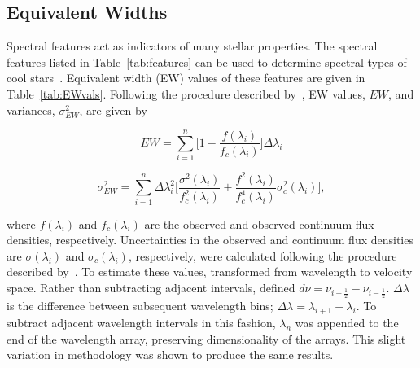 \subsection{Equivalent Widths}

Spectral features act as indicators of many stellar properties.  The 
spectral features listed in Table~\ref{tab:features} 
can be used to determine spectral types of cool 
stars~\cite{Rayner_2009}.  Equivalent width (EW) 
values of these features are given in Table~\ref{tab:EWvals}.  
Following the procedure described by~\cite{Cushing_2005}, EW values, $EW$, and 
variances, $\sigma_{EW}^{2}$, are given by


\begin{equation}\label{eq:EW}
	EW = \sum_{i=1}^{n} \bigg[1 - \frac{f(\lambda_{i})}{f_{c}(\lambda_{i})} \bigg] \Delta\lambda_{i}
\end{equation}

\begin{equation}\label{eq:EWvar}
	\sigma_{EW}^{2} = \sum_{i=1}^{n} \Delta\lambda_{i}^{2} \bigg[ \frac{\sigma^{2}(\lambda_{i})}{f_{c}^{2}(\lambda_{i})} + \frac{f^{2}(\lambda_{i})}{f_{c}^{4}(\lambda_{i})}\sigma_{c}^{2}(\lambda_{i}) \bigg],
\end{equation}


\noindent where $f(\lambda_{i})$ and $f_{c}(\lambda_{i})$ are the observed 
and observed continuum flux densities, respectively.  Uncertainties in the 
observed and continuum flux densities are $\sigma(\lambda_{i})$ and 
$\sigma_{c}(\lambda_{i})$, respectively, were calculated following the procedure 
described by~\cite{Sembach_1992}.  To estimate these values, \cite{Sembach_1992} 
transformed from wavelength to velocity space.  Rather than subtracting adjacent intervals, 
\cite{Sembach_1992} defined $d\nu = \nu_{i+\frac{1}{2}} - \nu_{i-\frac{1}{2}}$.  
$\Delta\lambda$ is the difference between subsequent wavelength bins; 
$\Delta\lambda = \lambda_{i+1} - \lambda_{i}$.  To subtract adjacent 
wavelength intervals in this fashion, $\lambda_{n}$ was appended to the 
end of the wavelength array, preserving dimensionality of the arrays.  
This slight variation in methodology was shown to produce the same results.



